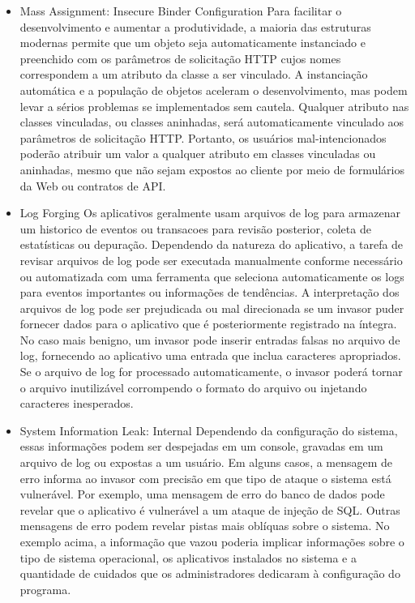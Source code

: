 \documentclass[12pt]{article}
\begin{document}
\begin{itemize}
 \item Mass Assignment: Insecure Binder Configuration
  \subitem Para facilitar o desenvolvimento e aumentar a produtividade, a maioria das estruturas modernas permite que um objeto seja automaticamente instanciado e preenchido com os parâmetros de solicitação HTTP cujos nomes correspondem a um atributo da classe a ser vinculado. A instanciação automática e a população de objetos aceleram o desenvolvimento, mas podem levar a sérios problemas se implementados sem cautela. Qualquer atributo nas classes vinculadas, ou classes aninhadas, será automaticamente vinculado aos parâmetros de solicitação HTTP. Portanto, os usuários mal-intencionados poderão atribuir um valor a qualquer atributo em classes vinculadas ou aninhadas, mesmo que não sejam expostos ao cliente por meio de formulários da Web ou contratos de API.
	
 \item Log Forging
  \subitem Os aplicativos geralmente usam arquivos de log para armazenar um historico de eventos ou transacoes para revisão posterior, coleta de estatísticas ou depuração.
 Dependendo da natureza do aplicativo, a tarefa de revisar arquivos de log pode ser executada manualmente conforme necessário ou automatizada com uma ferramenta que seleciona automaticamente os logs para eventos importantes ou informações de tendências.
A interpretação dos arquivos de log pode ser prejudicada ou mal direcionada se um invasor puder fornecer dados para o aplicativo que é posteriormente registrado na íntegra. No caso mais benigno, um invasor pode inserir entradas falsas no arquivo de log, fornecendo ao aplicativo uma entrada que inclua caracteres apropriados. Se o arquivo de log for processado automaticamente, o invasor poderá tornar o arquivo inutilizável corrompendo o formato do arquivo ou injetando caracteres inesperados.

 \item System Information Leak: Internal
  \subitem Dependendo da configuração do sistema, essas informações podem ser despejadas em um console, gravadas em um arquivo de log ou expostas a um usuário. Em alguns casos, a mensagem de erro informa ao invasor com precisão em que tipo de ataque o sistema está vulnerável. Por exemplo, uma mensagem de erro do banco de dados pode revelar que o aplicativo é vulnerável a um ataque de injeção de SQL. Outras mensagens de erro podem revelar pistas mais oblíquas sobre o sistema. No exemplo acima, a informação que vazou poderia implicar informações sobre o tipo de sistema operacional, os aplicativos instalados no sistema e a quantidade de cuidados que os administradores dedicaram à configuração do programa.
\end{itemize} 
\end{document}
